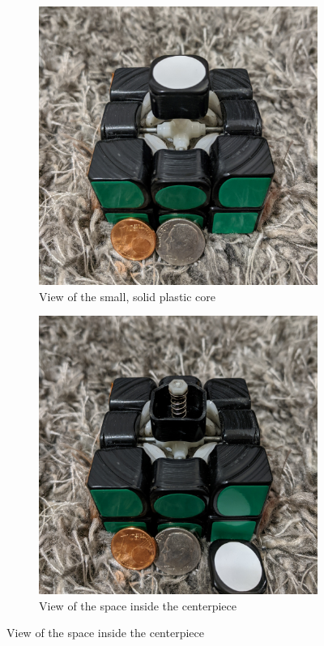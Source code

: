 \begin{figure}[h]
    \centering
    \caption{Internal pieces of a standard speedcube (Gans 356)}
    \label{fig:356-core}
    \begin{subfigure}{.45\textwidth}
        \centering
        \caption{View of the small, solid plastic core}
        \label{fig:356-core-closed}
        \includegraphics[width=\linewidth]{Figures/6 PCB Design/356_core_cropped.jpg}
    \end{subfigure}
    \begin{subfigure}{.45\textwidth}
        \centering
        \caption{View of the space inside the centerpiece}
        \label{fig:356-core-open}
        \includegraphics[width=\linewidth]{Figures/6 PCB Design/356_core_open_cropped.jpg}
    \end{subfigure}
\end{figure}

